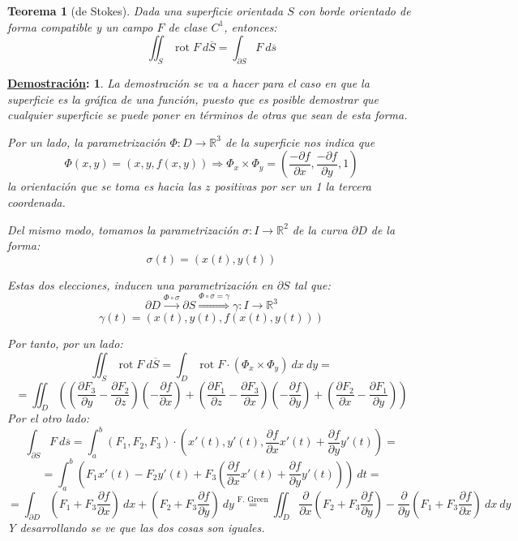 \documentclass[10pt,a4paper,openright]{book}
\theoremstyle{break}
\newtheorem*{theo}{Teorema}
\newtheorem*{demo}{\underline{Demostración}:}
\DeclareMathOperator{\rot}{rot}
\newcommand{\dif}[1]{\ d#1}
\begin{document}
\begin{theo}[de Stokes]
Dada una superficie orientada $S$ con borde orientado de forma compatible y un campo $F$ de clase $C^1$, entonces:
$$\iint_{S} \rot F \dif{\overline{S}} = \int_{\partial S} F \dif{\overline{s}}$$
\end{theo}
\begin{demo}
La demostración se va a hacer para el caso en que la superficie es la gráfica de una función, puesto que es posible demostrar que cualquier superficie se puede poner en términos de otras que sean de esta forma.

Por un lado, la parametrización $\Phi: D \rightarrow \mathbb{R}^3$ de la superficie nos indica que
$$\Phi\left( x, y \right) = \left( x, y, f\left( x, y \right) \right)\Rightarrow \Phi_x \times \Phi_y = \left( \frac{-\partial f}{\partial x}, \frac{-\partial f}{\partial y}, 1\right)$$
la orientación que se toma es hacia las $z$ positivas por ser un 1 la tercera coordenada.

Del mismo modo, tomamos la parametrización $\sigma: I \rightarrow \mathbb{R}^2$ de la curva $\partial D$ de la forma:
$$\sigma\left( t \right) = \left( x\left( t \right), y\left( t \right) \right)$$

Estas dos elecciones, inducen una parametrización en $\partial S$ tal que: 
$$\partial D \xrightarrow{\Phi \circ \sigma} \partial S \stackrel{\Phi \circ \sigma = \gamma}{\Rightarrow} \gamma: I \rightarrow \mathbb{R}^3$$
$$\gamma\left( t \right) = \left( x\left( t \right), y\left( t \right), f\left( x\left( t \right), y\left( t \right) \right) \right)$$

Por tanto, por un lado:
$$\iint_{S} \rot F \dif{\overline{S}} = \int_{D} \rot F \cdot \left( \Phi_x \times \Phi_y \right) \dif{x} \dif{y} =$$
$$= \iint_{D} \left( \left( \frac{\partial F_3}{\partial y} - \frac{\partial F_2}{\partial z} \right) \left( -\frac{\partial f}{\partial x} \right) + \left( \frac{\partial F_1}{\partial z} - \frac{\partial F_3}{\partial x} \right) \left( -\frac{\partial f}{\partial y} \right) + \left( \frac{\partial F_2}{\partial x} - \frac{\partial F_1}{\partial y} \right) \right)$$
Por el otro lado: 
$$\int_{\partial S} F \dif{\overline{s}} = \int_{a}^{b} \left( F_1, F_2, F_3 \right) \cdot \left( x'\left( t \right), y'\left( t \right), \frac{\partial f}{\partial x} x'\left( t \right) + \frac{\partial f}{\partial y} y'\left( t \right) \right) = $$
$$= \int_{a}^{b} \left( F_1x'\left( t \right) - F_2y'\left( t \right) + F_3\left( \frac{\partial f}{\partial x} x'\left( t \right) + \frac{\partial f}{\partial y} y'\left( t \right) \right) \right) \dif{t} = $$
$$= \int_{\partial D} \left( F_1 + F_3 \frac{\partial f}{\partial x} \right) \dif{x} + \left( F_2 + F_3 \frac{\partial f}{\partial y} \right) \dif{y} \stackrel{\text{F. Green}}{=}\iint_{D} \frac{\partial}{\partial x} \left( F_2 + F_3 \frac{\partial f}{\partial y} \right) - \frac{\partial}{\partial y} \left( F_1 + F_3 \frac{\partial f}{\partial x} \right) \dif{x} \dif{y}$$
Y desarrollando se ve que las dos cosas son iguales.
\end{demo}
\end{document}
